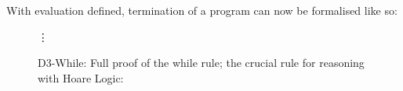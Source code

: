 \documentclass[oneside,12pt]{article}
\begin{document}
{\centering


\vspace{-4em}


}

With evaluation defined, termination of a program can now be formalised like so:


{\advance{}\mathindent



\vspace{-0.8cm}



\vspace{-0.8cm}



\vspace{-0.8cm}



}

\lipsum[75]

{\small }


\lipsum[34]

{\centering }

\lipsum[67]

{\centering }

\lipsum[66]

{\centering }

\lipsum[66]

{\centering }

\lipsum[66]



\lipsum[75]

\lipsum[66]

\lipsum[66]



\lipsum[66]



\begin{figure}
  \caption{D3-While: Full proof of the while rule; the crucial rule for reasoning with Hoare Logic:}
  \centering
  \small
  
  {\centering \hfill \Huge{\vdots} \hfill }
\end{figure}
\end{document}
